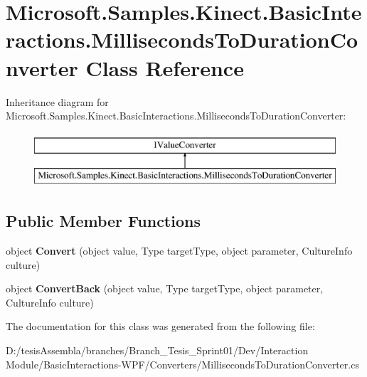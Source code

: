 \hypertarget{class_microsoft_1_1_samples_1_1_kinect_1_1_basic_interactions_1_1_milliseconds_to_duration_converter}{\section{Microsoft.\-Samples.\-Kinect.\-Basic\-Interactions.\-Milliseconds\-To\-Duration\-Converter Class Reference}
\label{class_microsoft_1_1_samples_1_1_kinect_1_1_basic_interactions_1_1_milliseconds_to_duration_converter}
}
Inheritance diagram for Microsoft.\-Samples.\-Kinect.\-Basic\-Interactions.\-Milliseconds\-To\-Duration\-Converter\-:\begin{figure}[H]
\begin{center}
\leavevmode
\includegraphics[height=2.000000cm]{class_microsoft_1_1_samples_1_1_kinect_1_1_basic_interactions_1_1_milliseconds_to_duration_converter}
\end{center}
\end{figure}
\subsection*{Public Member Functions}
\begin{DoxyCompactItemize}
\item 
\hypertarget{class_microsoft_1_1_samples_1_1_kinect_1_1_basic_interactions_1_1_milliseconds_to_duration_converter_a7aa1abfda9837ae87a18602727926ea5}{object {\bfseries Convert} (object value, Type target\-Type, object parameter, Culture\-Info culture)}\label{class_microsoft_1_1_samples_1_1_kinect_1_1_basic_interactions_1_1_milliseconds_to_duration_converter_a7aa1abfda9837ae87a18602727926ea5}

\item 
\hypertarget{class_microsoft_1_1_samples_1_1_kinect_1_1_basic_interactions_1_1_milliseconds_to_duration_converter_ac0d60a626528d034e1d2a46b4a7b7aa4}{object {\bfseries Convert\-Back} (object value, Type target\-Type, object parameter, Culture\-Info culture)}\label{class_microsoft_1_1_samples_1_1_kinect_1_1_basic_interactions_1_1_milliseconds_to_duration_converter_ac0d60a626528d034e1d2a46b4a7b7aa4}

\end{DoxyCompactItemize}


The documentation for this class was generated from the following file\-:\begin{DoxyCompactItemize}
\item 
D\-:/tesis\-Assembla/branches/\-Branch\-\_\-\-Tesis\-\_\-\-Sprint01/\-Dev/\-Interaction Module/\-Basic\-Interactions-\/\-W\-P\-F/\-Converters/Milliseconds\-To\-Duration\-Converter.\-cs\end{DoxyCompactItemize}
